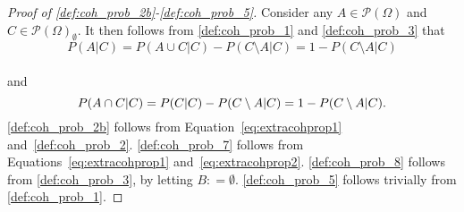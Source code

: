\documentclass[10pt,a4paper]{paper}
\theoremstyle{definition}
\newcommand{\paths}{\Omega}
\newcommand{\power}{\mathcal{P}(\paths)}
\newcommand{\nonemptypower}{\power_{\emptyset}}
\newcommand{\coloneqq}{:\!=}
\begin{document}
\begin{proof}[Proof of \ref{def:coh_prob_2b}-\ref{def:coh_prob_5}]
Consider any $A\in\power$ and $C\in\nonemptypower$. It then follows from \ref{def:coh_prob_1} and \ref{def:coh_prob_3} that
\vspace{-7pt}
\begin{equation}\label{eq:extracohprop1}
P(A\vert C)
=P(A\cup C\vert C)-P(C\setminus A\vert C)
=1-P(C\setminus A\vert C)
\end{equation}\\[-20pt]
and
\begin{equation}\label{eq:extracohprop2}
P(A\cap C\vert C)
=P(C\vert C)-P(C\setminus A\vert C)
=1-P(C\setminus A\vert C).
\vspace{6pt}
\end{equation}
\ref{def:coh_prob_2b} follows from Equation~\eqref{eq:extracohprop1} and~\ref{def:coh_prob_2}. \ref{def:coh_prob_7} follows from Equations~\eqref{eq:extracohprop1} and~\eqref{eq:extracohprop2}. \ref{def:coh_prob_8} follows from \ref{def:coh_prob_3}, by letting $B\coloneqq\emptyset$. \ref{def:coh_prob_5} follows trivially from \ref{def:coh_prob_1}.
\end{proof}
\end{document}
